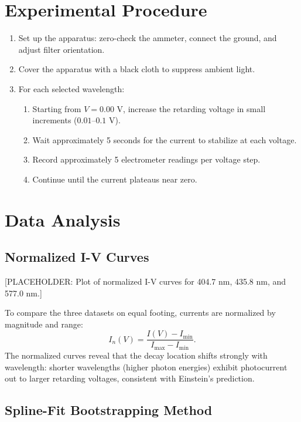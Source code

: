 \documentclass[12pt]{article}
\begin{document}
\section{Experimental Procedure}

\begin{enumerate}
    \item Set up the apparatus: zero-check the ammeter, connect the ground, and adjust filter orientation.
    \item Cover the apparatus with a black cloth to suppress ambient light.
    \item For each selected wavelength:
        \begin{enumerate}
            \item Starting from $V = 0.00$ V, increase the retarding voltage in small increments ($0.01$--$0.1$ V).
            \item Wait approximately 5 seconds for the current to stabilize at each voltage.
            \item Record approximately 5 electrometer readings per voltage step.
            \item Continue until the current plateaus near zero.
        \end{enumerate}
\end{enumerate}

\section{Data Analysis}

\subsection{Normalized I-V Curves}

[PLACEHOLDER: Plot of normalized I-V curves for 404.7 nm, 435.8 nm, and 577.0 nm.]

To compare the three datasets on equal footing, currents are normalized by magnitude and range:
\begin{equation}
    I_n(V) = \frac{I(V) - I_{\min}}{I_{\max} - I_{\min}}.
\end{equation}
The normalized curves reveal that the decay location shifts strongly with wavelength: shorter wavelengths (higher photon energies) exhibit photocurrent out to larger retarding voltages, consistent with Einstein's prediction.

\subsection{Spline-Fit Bootstrapping Method}
\end{document}
